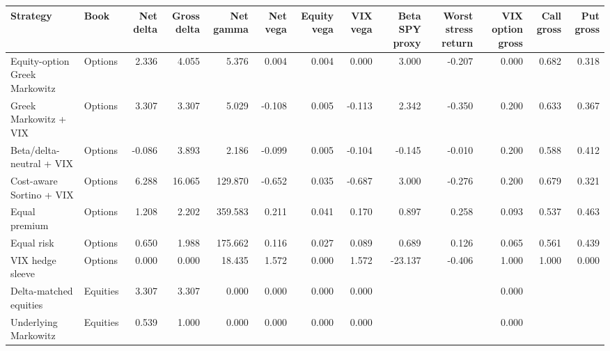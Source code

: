 \begin{tabular}{llrrrrrrrrrrr}
\toprule
Strategy & Book & Net delta & Gross delta & Net gamma & Net vega & Equity vega & VIX vega & Beta SPY proxy & Worst stress return & VIX option gross & Call gross & Put gross \\
\midrule
Equity-option Greek Markowitz & Options & 2.336 & 4.055 & 5.376 & 0.004 & 0.004 & 0.000 & 3.000 & -0.207 & 0.000 & 0.682 & 0.318 \\
Greek Markowitz + VIX & Options & 3.307 & 3.307 & 5.029 & -0.108 & 0.005 & -0.113 & 2.342 & -0.350 & 0.200 & 0.633 & 0.367 \\
Beta/delta-neutral + VIX & Options & -0.086 & 3.893 & 2.186 & -0.099 & 0.005 & -0.104 & -0.145 & -0.010 & 0.200 & 0.588 & 0.412 \\
Cost-aware Sortino + VIX & Options & 6.288 & 16.065 & 129.870 & -0.652 & 0.035 & -0.687 & 3.000 & -0.276 & 0.200 & 0.679 & 0.321 \\
Equal premium & Options & 1.208 & 2.202 & 359.583 & 0.211 & 0.041 & 0.170 & 0.897 & 0.258 & 0.093 & 0.537 & 0.463 \\
Equal risk & Options & 0.650 & 1.988 & 175.662 & 0.116 & 0.027 & 0.089 & 0.689 & 0.126 & 0.065 & 0.561 & 0.439 \\
VIX hedge sleeve & Options & 0.000 & 0.000 & 18.435 & 1.572 & 0.000 & 1.572 & -23.137 & -0.406 & 1.000 & 1.000 & 0.000 \\
Delta-matched equities & Equities & 3.307 & 3.307 & 0.000 & 0.000 & 0.000 & 0.000 &  &  & 0.000 &  &  \\
Underlying Markowitz & Equities & 0.539 & 1.000 & 0.000 & 0.000 & 0.000 & 0.000 &  &  & 0.000 &  &  \\
\bottomrule
\end{tabular}
